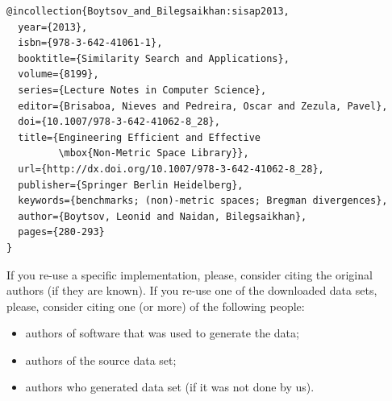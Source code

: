 \documentclass[runningheads,a4paper]{llncs}
\begin{document}
\begin{verbatim}
@incollection{Boytsov_and_Bilegsaikhan:sisap2013,
  year={2013},
  isbn={978-3-642-41061-1},
  booktitle={Similarity Search and Applications},
  volume={8199},
  series={Lecture Notes in Computer Science},
  editor={Brisaboa, Nieves and Pedreira, Oscar and Zezula, Pavel},
  doi={10.1007/978-3-642-41062-8_28},
  title={Engineering Efficient and Effective 
         \mbox{Non-Metric Space Library}},
  url={http://dx.doi.org/10.1007/978-3-642-41062-8_28},
  publisher={Springer Berlin Heidelberg},
  keywords={benchmarks; (non)-metric spaces; Bregman divergences},
  author={Boytsov, Leonid and Naidan, Bilegsaikhan},
  pages={280-293}
}
\end{verbatim}


If you re-use a specific implementation, please,
consider citing the original authors (if they are known).
If you re-use one of the downloaded data sets,
please, consider citing one (or more) of the following people:
\begin{itemize}
\item authors of software that was used to generate the data;
\item authors of the source data set;
\item authors who generated data set (if it was not done by us).
\end{itemize}
\end{document}
